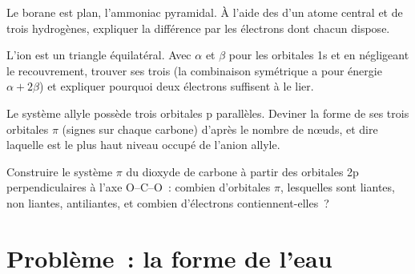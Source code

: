 \begin{exercise}[$\star\star$]\label{exo:b2:fragment-orbitals:9}
Le borane  est plan, l'ammoniac pyramidal. À l'aide des  d'un
atome central et de trois hydrogènes, expliquer la différence par les électrons dont chacun dispose.
\end{exercise}

\begin{exercise}[$\star\star\star$]\label{exo:b2:fragment-orbitals:10}
L'ion  est un triangle équilatéral. Avec $\alpha$ et $\beta$ pour les orbitales 1s
et en négligeant le recouvrement, trouver ses trois  (la combinaison
symétrique a pour énergie $\alpha + 2\beta$) et expliquer pourquoi deux électrons suffisent à
le lier.
\end{exercise}

\begin{exercise}[$\star\star\star$]\label{exo:b2:fragment-orbitals:11}
Le système allyle  possède trois orbitales p parallèles. Deviner la forme de
ses trois orbitales $\pi$ (signes sur chaque carbone) d'après le nombre de nœuds, et dire laquelle
est le plus haut niveau occupé de l'anion allyle.
\end{exercise}

\begin{exercise}[$\star\star\star$]\label{exo:b2:fragment-orbitals:12}
Construire le système $\pi$ du dioxyde de carbone à partir des orbitales 2p perpendiculaires à
l'axe O--C--O~: combien d'orbitales $\pi$, lesquelles sont liantes, non liantes,
antiliantes, et combien d'électrons contiennent-elles~?
\end{exercise}

\section{Problème~: la forme de l'eau}

